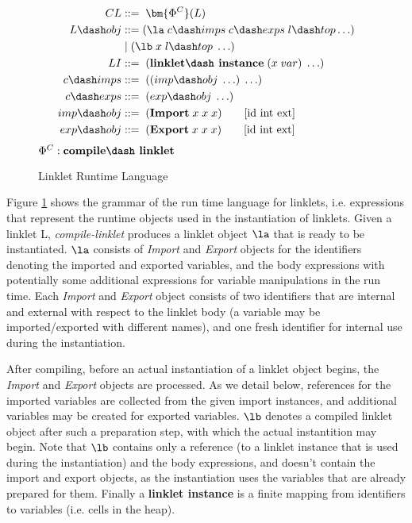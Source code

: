 \begin{figure}[h!]
  \begin{mdframed}
    \begin{align*}
      CL             &::=\; \bm{\Phi^C}(L)\\
      L\dash obj     &::= (\la\; c\dash imps \; c\dash exps \; l\dash top \ldots)\\
      \;           &\;|\; (\lb\; x\; l\dash top\; \ldots) \\
      LI             &::=\; (\textbf{linklet\dash instance}\; (x\; var)\; \ldots) \\
      c\dash imps    &::=\; ((imp\dash obj\; \ldots)\; \ldots)\\
      c\dash exps    &::=\; (exp\dash obj\; \ldots)\\
      imp\dash obj   &::=\; (\textbf{Import}\; x\; x\; x) \tag*{[id int ext]} \\
      exp\dash obj   &::=\; (\textbf{Export}\; x\; x\; x) \tag*{[id int ext]} \\
    \end{align*}
    \hfill \footnotesize $\Phi^C : \textbf{compile\dash linklet}$
    \caption{Linklet Runtime Language}
    \label{fig:linklet-runtime}
  \end{mdframed}
\end{figure}

Figure \ref{fig:linklet-runtime} shows the grammar of the run\dash
time language for linklets, i.e. expressions that represent the
run\dash time objects used in the instantiation of linklets. Given a
linklet L, \emph{compile-linklet} produces a linklet object $\la$ that
is ready to be instantiated. $\la$ consists of \textit{Import} and
\textit{Export} objects for the identifiers denoting the imported and
exported variables, and the body expressions with potentially some
additional expressions for variable manipulations in the run\dash
time. Each \textit{Import} and \textit{Export} object consists of two
identifiers that are internal and external with respect to the linklet
body (a variable may be imported/exported with different names), and
one fresh identifier for internal use during the instantiation.

After compiling, before an actual instantiation of a linklet object
begins, the \textit{Import} and \textit{Export} objects are
processed. As we detail below, references for the imported variables
are collected from the given import instances, and additional
variables may be created for exported variables. $\lb$ denotes a
compiled linklet object after such a preparation step, with which the
actual instantition may begin. Note that $\lb$ contains only a
reference (to a linklet instance that is used during the
instantiation) and the body expressions, and doesn't contain the
import and export objects, as the instantiation uses the variables
that are already prepared for them. Finally a \textbf{linklet\dash
  instance} is a finite mapping from identifiers to variables
(i.e. cells in the heap).

